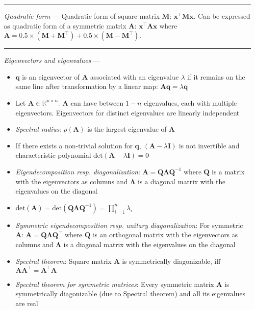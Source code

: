 {\color{lightgray}\hrule height 0.001mm}

\emph{Quadratic form} --- Quadratic form of square matrix $\boldsymbol{M}$: $\boldsymbol{x}^\intercal\boldsymbol{M}\boldsymbol{x}$. Can be expressed as quadratic form of a symmetric matrix $\boldsymbol{A}$: $\boldsymbol{x}^\intercal\boldsymbol{A}\boldsymbol{x}$ where $\boldsymbol{A} = 0.5 \times (\boldsymbol{M} + \boldsymbol{M}^\intercal) + 0.5 \times (\boldsymbol{M} - \boldsymbol{M}^\intercal)$.

{\color{lightgray}\hrule height 0.001mm}

\emph{Eigenvectors and eigenvalues} --- 
\begin{itemize}
    \item $\boldsymbol{q}$ is an eigenvector of $\boldsymbol{A}$ associated with an eigenvalue $\lambda$ if it remains on the same line after transformation by a linear map: $\boldsymbol{A}\boldsymbol{q} = \lambda\boldsymbol{q}$
    \item Let $\boldsymbol{A} \in \mathbb{R}^{n \times n}$. $\boldsymbol{A}$ can have between $1-n$ eigenvalues, each with multiple eigenvectors. Eigenvectors for distinct eigenvalues are linearly independent
    \item \emph{Spectral radius}: $\rho(\boldsymbol{A})$ is the largest eigenvalue of $\boldsymbol{A}$
    \item If there exists a non-trivial solution for $\boldsymbol{q}$, $(\boldsymbol{A}-\lambda\boldsymbol{I})$ is not invertible and characteristic polynomial $\textrm{det}(\boldsymbol{A}-\lambda\boldsymbol{I}) = 0$
    \item \emph{Eigendecomposition resp. diagonalization}: $\boldsymbol{A} = \boldsymbol{Q}\boldsymbol{\Lambda}\boldsymbol{Q}^{-1}$ where $\boldsymbol{Q}$ is a matrix with the eigenvectors as columns and $\boldsymbol{\Lambda}$ is a diagonal matrix with the eigenvalues on the diagonal
    \item $\textrm{det}(\boldsymbol{A}) = \textrm{det}(\boldsymbol{Q}\boldsymbol{\Lambda}\boldsymbol{Q}^{-1}) = \prod_{i=1}^n \lambda_i$
    \item \emph{Symmetric eigendecomposition resp. unitary diagonalization}: For symmetric $\boldsymbol{A}$: $\boldsymbol{A} = \boldsymbol{Q}\boldsymbol{\Lambda}\boldsymbol{Q}^\intercal$ where $\boldsymbol{Q}$ is an orthogonal matrix with the eigenvectors as columns and $\boldsymbol{\Lambda}$ is a diagonal matrix with the eigenvalues on the diagonal
    \item \emph{Spectral theorem}: Square matrix $\boldsymbol{A}$ is symmetrically diagonizable, iff $\boldsymbol{A}\boldsymbol{A}^\intercal = \boldsymbol{A}^\intercal\boldsymbol{A}$
    \item \emph{Spectral theorem for symmetric matrices}: Every symmetric matrix $\boldsymbol{A}$ is symmetrically diagonizable (due to Spectral theorem) and all its eigenvalues are real
\end{itemize}

